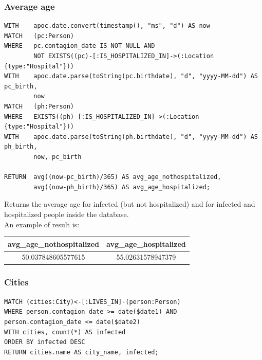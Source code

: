 \documentclass[12pt, a4paper]{article}
\begin{document}
\subsubsection{Average age}

\begin{tcolorbox}[fontupper=\scriptsize]
    \begin{verbatim}
WITH    apoc.date.convert(timestamp(), "ms", "d") AS now
MATCH   (pc:Person)
WHERE   pc.contagion_date IS NOT NULL AND
        NOT EXISTS((pc)-[:IS_HOSPITALIZED_IN]->(:Location {type:"Hospital"}))
WITH    apoc.date.parse(toString(pc.birthdate), "d", "yyyy-MM-dd") AS pc_birth,
        now
MATCH   (ph:Person)
WHERE   EXISTS((ph)-[:IS_HOSPITALIZED_IN]->(:Location {type:"Hospital"}))
WITH    apoc.date.parse(toString(ph.birthdate), "d", "yyyy-MM-dd") AS ph_birth,
        now, pc_birth

RETURN  avg((now-pc_birth)/365) AS avg_age_nothospitalized, 
        avg((now-ph_birth)/365) AS avg_age_hospitalized;
    \end{verbatim}
\end{tcolorbox}

\noindent %
Returns the average age for infected (but not hospitalized) and for infected 
and hospitalized people inside the database. \\
An example of result is:

\begin{center}
    \begin{tabular}{ |c|c| } 
        \hline
        avg\_age\_nothospitalized & avg\_age\_hospitalized \\
        \hline
        50.037848605577615 & 55.02631578947379 \\
        \hline
    \end{tabular}
\end{center}

\subsubsection{Cities}

\begin{tcolorbox}[fontupper=\scriptsize]
    \begin{verbatim}
MATCH (cities:City)<-[:LIVES_IN]-(person:Person) 
WHERE person.contagion_date >= date($date1) AND 
person.contagion_date <= date($date2)
WITH cities, count(*) AS infected
ORDER BY infected DESC
RETURN cities.name AS city_name, infected;
    \end{verbatim}
\end{tcolorbox}
\end{document}
